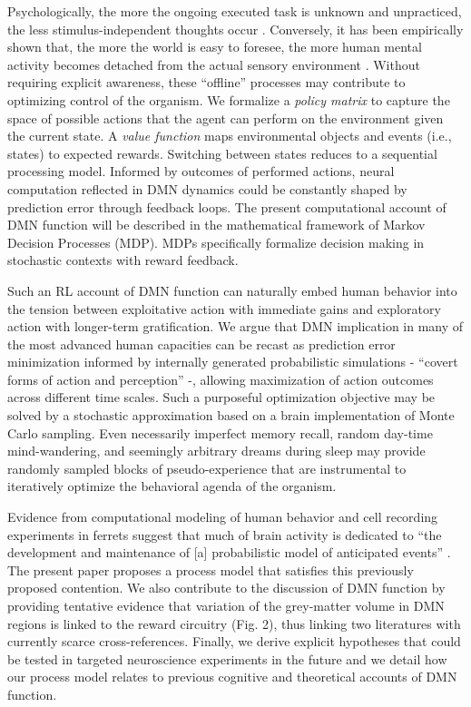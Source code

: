 \documentclass[10pt,letterpaper]{article}
\begin{document}
Psychologically,
the more the ongoing executed task is unknown and unpracticed,
the less stimulus-independent thoughts occur
\citep{filler1973daydreaming, teasdale1995stimulus, christoff2016mind}.
Conversely,
it has been empirically shown that, the more the world is easy to foresee,
the more human mental activity
becomes detached from the actual sensory environment
\citep{antrobus1966studies, pope1978regulation, mason2007, weiss2006}.
Without requiring explicit awareness,
these ``offline'' processes may contribute
to optimizing control of the organism.
We formalize
a \textit{policy matrix} to capture the space of possible actions that
the agent can perform
on the environment given the current state. A \textit{value function}
maps environmental objects and events (i.e., states) to expected rewards.
Switching between states reduces to a sequential processing model.
Informed by outcomes of performed actions, neural computation reflected in
DMN dynamics could be constantly shaped by prediction error through feedback loops.
The present computational account of DMN function will be described in the mathematical framework of Markov Decision Processes (MDP). MDPs specifically formalize decision making in stochastic contexts with reward feedback.



Such an RL account of DMN function can naturally embed human behavior
into the tension between exploitative action with immediate gains and
exploratory action with longer-term gratification.
We argue that DMN implication in many
of the most advanced human capacities
can be recast as prediction error minimization
informed by internally generated probabilistic simulations
- ``covert forms of action and perception'' \citep{pezzulo2011grounding} -,
allowing maximization of action outcomes across different time scales.
Such a purposeful optimization objective
may be solved by a stochastic approximation
based on a brain implementation of Monte Carlo sampling.
Even necessarily imperfect memory recall,
random day-time mind-wandering, and
seemingly arbitrary dreams during sleep
may provide randomly sampled blocks of pseudo-experience  that are
instrumental to iteratively
optimize the behavioral agenda of the organism.



Evidence from computational modeling of human behavior \citep{kording2004bayesian} and cell recording experiments in ferrets \citep{fiser2004small} suggest that
much of brain activity is dedicated to
``the development and maintenance of [a]
probabilistic model of anticipated events''
\citep{raichle2005intrinsic}.
The present paper proposes a
process model that satisfies this previously proposed contention.
We also contribute to the discussion of DMN function
by providing tentative evidence that
variation of the grey-matter volume in DMN regions
is linked to the reward circuitry (Fig. 2),
thus linking two literatures with currently scarce cross-references.
Finally,
we derive explicit hypotheses that could be tested in targeted neuroscience
experiments in the future
and
we detail how our process model relates
to previous cognitive and theoretical accounts of DMN function.
\end{document}
